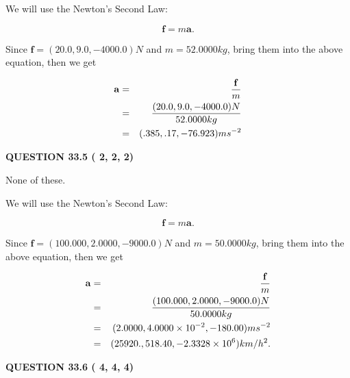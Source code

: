 \documentclass[12pt]{article}
\begin{document}
We will use the Newton's Second Law:
 
\[
\mathbf{f}=m\mathbf{a}.
\]
 
Since $\mathbf{f}= %
(20.0 , 9.0 , -4000.0) N$
and $m= %
52.0000kg$, bring them into the above equation, then we get
 
\begin{eqnarray*}
\mathbf{a}&=&\frac{\mathbf{f}}m  \\
&=&\frac{ %
(20.0 , 9.0 , -4000.0) N}{ %
52.0000kg}  \\
&=& %
(.385 , .17 , -76.923) ms^{-2}
\end{eqnarray*}
 
 
 
  
\vspace{0.2in}
  
{\textbf{\Large{QUESTION
33.5 
 (          2,          2,          2)
}}}
  
  
 
 
\noindent{}
 
 
 None of these.
 
 
 
 
 
 
\noindent{}

We will use the Newton's Second Law:
 
\[
\mathbf{f}=m\mathbf{a}.
\]
 
Since $\mathbf{f}=( %
100.000,  %
2.0000,  %
-9000.0 )N$
and $m= %
50.0000kg$, bring them into the above equation, then we get
 
\begin{eqnarray*}
\mathbf{a}&=&\frac{\mathbf{f}}m  \\
&=&\frac{(
100.000 ,
2.0000 ,
-9000.0 )N
}{ %
50.0000 kg}  \\
&=&(
2.0000 ,
4.0000 \times 10^{-2},
-180.00
)ms^{-2} \\
&=&(
25920. ,
518.40 ,
-2.3328 \times 10^{6}
)km/h^2.
\end{eqnarray*}
 
 
 
  
\vspace{0.2in}
  
{\textbf{\Large{QUESTION
33.6 
 (          4,          4,          4)
}}}
  
  
 
 
\noindent{}
  
\end{document}
